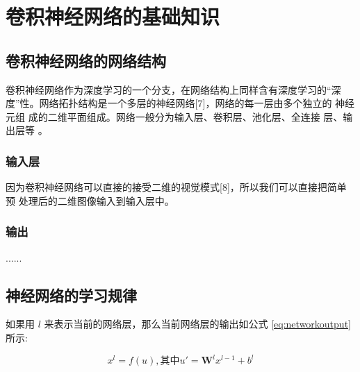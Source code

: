 \chapter{卷积神经网络的基础知识}
\section{卷积神经网络的网络结构}
卷积神经网络作为深度学习的一个分支，在网络结构上同样含有深度学习的“深
度”性。网络拓扑结构是一个多层的神经网络[7]，网络的每一层由多个独立的
神经元组 成的二维平面组成。网络一般分为输入层、卷积层、池化层、全连接
层、输出层等 \cite{tiledsets}。

\subsection{输入层}
因为卷积神经网络可以直接的接受二维的视觉模式[8]，所以我们可以直接把简单预
处理后的二维图像输入到输入层中。

\subsection{输出}
......

\section{神经网络的学习规律}
如果用 $l$ 来表示当前的网络层，那么当前网络层的输出如公式 \ref{eq:networkoutput} 所示:

\begin{equation}
  \label{eq:networkoutput}
  x^l=f(u), \text{其中} u'=\mathbf{W}^l x^{l-1}+b^l
\end{equation}